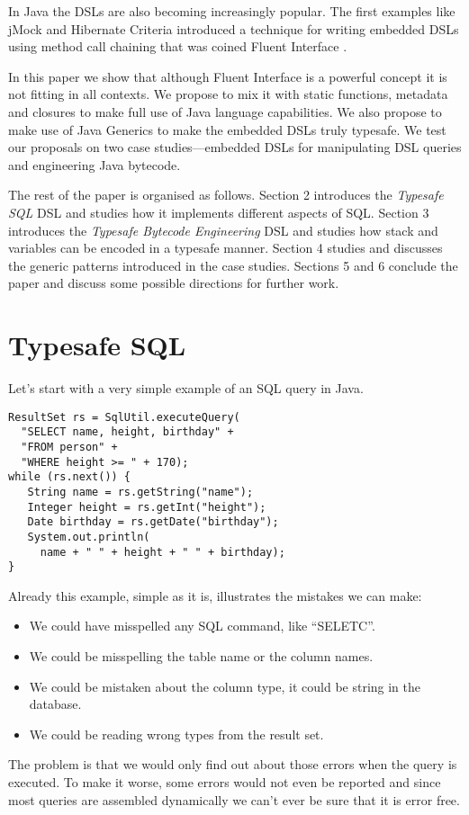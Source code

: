 \documentclass{sig-alternate}
\begin{document}
In Java the DSLs are also becoming increasingly popular. The first examples like jMock \cite{freeman2004jsr} and Hibernate Criteria \cite{bauer2005ha} introduced a technique for writing embedded DSLs using method call chaining that was coined Fluent Interface \cite{fowler2005}. 

In this paper we show that although Fluent Interface is a powerful concept it is not fitting in all contexts. We propose to mix it with static functions, metadata and closures to make full use of Java language capabilities. We also propose to make use of Java Generics to make the embedded DSLs truly typesafe. We test our proposals on two case studies---embedded DSLs for manipulating DSL queries and engineering Java bytecode.

The rest of the paper is organised as follows. Section 2 introduces the \emph{Typesafe SQL} DSL and studies how it implements different aspects of SQL. Section 3 introduces the \emph{Typesafe Bytecode Engineering} DSL and studies how stack and variables can be encoded in a typesafe manner. Section 4 studies and discusses the generic patterns introduced in the case studies. Sections 5 and 6 conclude the paper and discuss some possible directions for further work.

\section{Typesafe SQL}

Let's start with a very simple example of an SQL query in Java. 
\begin{verbatim}
ResultSet rs = SqlUtil.executeQuery(
  "SELECT name, height, birthday" + 
  "FROM person" +
  "WHERE height >= " + 170);
while (rs.next()) {
   String name = rs.getString("name");
   Integer height = rs.getInt("height");
   Date birthday = rs.getDate("birthday");
   System.out.println(
     name + " " + height + " " + birthday);
}
\end{verbatim}

Already this example, simple as it is, illustrates the mistakes we can make:
\begin{itemize}
\item We could have misspelled any SQL command, like ``SELETC''.
\item We could be misspelling the table name or the column names.
\item We could be mistaken about the column type, it could be string in the database.
\item We could be reading wrong types from the result set.
\end{itemize}
The problem is that we would only find out about those errors when the query is executed. To make it worse, some errors would not even be reported and since most queries are assembled dynamically we can't ever be sure that it is error free.
\end{document}
